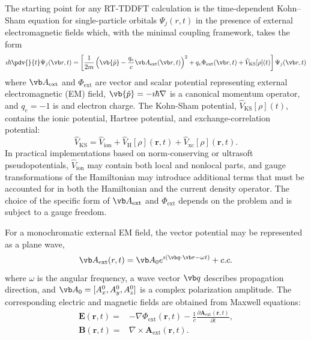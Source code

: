 The starting point for any RT-TDDFT calculation  is the time-dependent Kohn–Sham equation for single-particle orbitals 
$\Psi_j(r,t)$ in the presence of external electromagnetic fields which,  with  the minimal coupling framework, 
takes the form
\begin{equation}
	\imath \hbar \pdv{}{t} \Psi_j(\vb r,t) = \left[  \frac{1}{2m} \left( \vb{\hat p} - \frac{q_e}{c}\vb A_\mathrm{ext}(\vb r, t)\right)^2
	 + q_e \Phi_\mathrm{ext} (\vb r,t)   + \hat V_\mathrm{KS} [\rho](t)
	 \right] \Psi_j(\vb r,t)
\end{equation}
where $ \vb A_\mathrm{ext}$ and  $\Phi_\mathrm{ext}$ are vector and scalar potential representing external electromagnetic (EM) field, 
$\vb{\hat p} =-\imath\hbar \nabla $ is a canonical momentum operator,  
and $q_e=-1$ is and electron charge.
The Kohn-Sham potential, $ \hat V_\mathrm{KS} [\rho](t)$, 
 contains the ionic potential, Hartree potential, and exchange-correlation potential: 
\begin{equation}
  \hat V_{\mathrm{KS}} =   
  \hat V_{\mathrm{ion}} + \hat V_{\mathrm{H}}[\rho](\mathbf r,t) + \hat V_{\mathrm{xc}}[\rho](\mathbf r,t).
\end{equation}
In practical implementations based on norm-conserving or ultrasoft pseudopotentials,  $\hat V_{\mathrm{ion}}$ may contain both local
and nonlocal parts, and gauge transformations of the Hamiltonian may introduce additional terms that must be accounted for in both the
Hamiltonian and the current density operator.
The choice of the specific form of $\vb A_\mathrm{ext}$ and  $\Phi_\mathrm{ext}$ depends on the problem and is subject to a gauge freedom.\cite{gauge-theory}



 For a monochromatic external EM field, the vector potential may be represented as a plane wave,
\begin{equation}
	\vb A_\mathrm{ext}(r,t)= \vb  A_0 e^{\imath (\vb q \cdot \vb r -\omega t)} +  c.c. 
	\label{eq:plane_wave_vector_potential}
\end{equation}
where  $\omega$  is the angular frequency, a wave vector $\vb q$ describes propagation direction, and $\vb A_0=[A^0_x,A^0_y,A^0_z]$ is a complex polarization  amplitude.
The corresponding electric and magnetic fields are obtained from Maxwell equations:
\begin{align*}
	\mathbf E(\mathbf r,t) =& -\nabla \Phi_{\mathrm{ext}}(\mathbf r,t) - \frac{1}{c}\frac{\partial \mathbf A_{\mathrm{ext}}(\mathbf r,t)}{\partial t}, \\
	\mathbf B(\mathbf r,t) =& \nabla \times \mathbf A_{\mathrm{ext}}(\mathbf r,t).
\label{eq:em_fields_from_potentials}
\end{align*}

